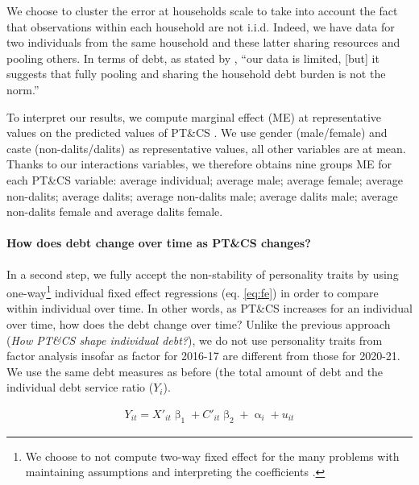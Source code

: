 \documentclass[a4paper, 11pt, onecolumn]{article}
\begin{document}
We choose to cluster the error at households scale to take into account the fact that observations within each household are not i.i.d.
Indeed, we have data for two individuals from the same household and these latter sharing resources and pooling others.%
In terms of debt, as stated by \cite{Reboul2021}, ``our data is limited, [but] it suggests that fully pooling and sharing the household debt burden is not the norm.''

To interpret our results, we compute marginal effect (ME) at representative values on the predicted values of PT\&CS \cite{Williams2012}.
We use gender (male/female) and caste (non-dalits/dalits) as representative values, all other variables are at mean.
Thanks to our interactions variables, we therefore obtains nine groups ME for each PT\&CS variable: average individual; average male; average female; average non-dalits; average dalits; average non-dalits male; average dalits male; average non-dalits female and average dalits female. 


\paragraph{How does debt change over time as PT\&CS changes?}
In a second step, we fully accept the non-stability of personality traits by using one-way\footnote{We choose to not compute two-way fixed effect for the many problems with maintaining assumptions and interpreting the coefficients \citep{Kropko2020,Imai2020}.} individual fixed effect regressions (eq. \ref{eq:fe}) in order to compare within individual over time.
In other words, as PT\&CS increases for an individual over time, how does the debt change over time?
Unlike the previous approach (\textit{How PT\&CS shape individual debt?}), we do not use personality traits from factor analysis insofar as factor for 2016-17 are different from those for 2020-21. 
We use the same debt measures as before (the total amount of debt and the individual debt service ratio ($Y_{i}$). 

\begin{equation}\label{eq:fe}
\begin{split}
Y_{it}=X'_{it}\upbeta_{1}+C'_{it}\upbeta_{2}+\upalpha_{i}+u_{it}
\end{split}
\end{equation}
\end{document}
